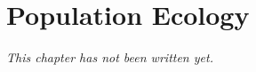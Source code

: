 \chapter{Population Ecology}\label{ch:b1:pop-ecology}


\emph{This chapter has not been written yet.}
